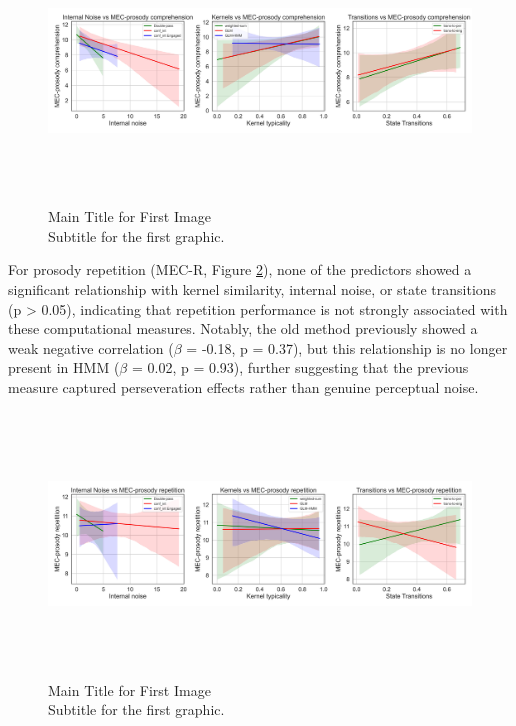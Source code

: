 \begin{figure}[H]
    \centering
    \includegraphics[width=17cm,height=7cm]{MainLayout/Images/chapter8/regression_results_mec_c.jpg}
    \caption{Main Title for First Image \\ \small Subtitle for the first graphic.}
    \label{fig:regression_results_mec_c}
\end{figure}
For prosody repetition (MEC-R, Figure \ref{fig:regression_results_mec_r}), none of the predictors showed a significant relationship with kernel similarity, internal noise, or state transitions (p > 0.05), indicating that repetition performance is not strongly associated with these computational measures. Notably, the old method previously showed a weak negative correlation ($\beta$ = -0.18, p = 0.37), but this relationship is no longer present in HMM ($\beta$ = 0.02, p = 0.93), further suggesting that the previous measure captured perseveration effects rather than genuine perceptual noise.           
\begin{figure}[H]
    \centering
    \includegraphics[width=17cm,height=7cm]{MainLayout/Images/chapter8/regression_results_mec_r.jpg}
    \caption{Main Title for First Image \\ \small Subtitle for the first graphic.}
    \label{fig:regression_results_mec_r}
\end{figure}

